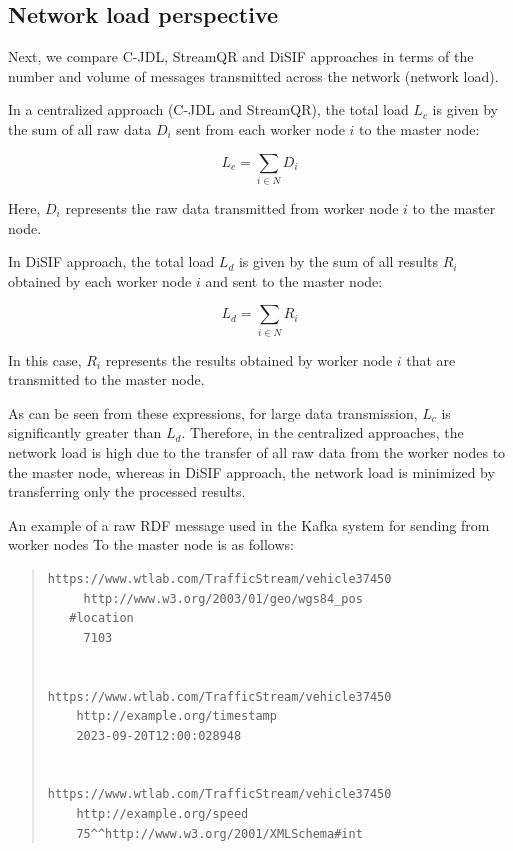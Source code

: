 \documentclass[5p,times]{elsarticle}
\begin{document}
\subsection{Network load perspective}


Next, we compare C-JDL, StreamQR and DiSIF approaches
 in terms of the number and volume of messages transmitted across the network (network load).

In a centralized approach (C-JDL and StreamQR), the total load \(L_c\) is given by the sum
 of all raw data \(D_i\) sent from each worker node \(i\) to the master node:

\begin{equation}
    L_c = \sum_{i \in N} D_i
    \end{equation}

Here, \(D_i\) represents the raw data transmitted from worker node \(i\) to the master node.

In DiSIF approach, the total load \(L_d\) is given by the sum of all results \(R_i\)
 obtained by each worker node \(i\) and sent to the master node:


\begin{equation}
    L_d = \sum_{i \in N} R_i
\end{equation}
    
In this case, \(R_i\) represents the results obtained by worker node \(i\)
 that are transmitted to the master node.

As can be seen from these expressions, for large data transmission, \(L_c\)
 is significantly greater than \(L_d\). Therefore, in the centralized approaches,
  the network load is high due to the transfer of all raw data from the worker nodes
   to the master node, whereas in DiSIF approach, the network load is minimized by transferring
    only the processed results.




An example of a raw RDF message used in the Kafka system for sending from worker nodes To
 the master node is as follows:

\small
\begin{quote}
\begin{verbatim}
https://www.wtlab.com/TrafficStream/vehicle37450
	 http://www.w3.org/2003/01/geo/wgs84_pos
   #location
	 7103


https://www.wtlab.com/TrafficStream/vehicle37450 
	http://example.org/timestamp 
	2023-09-20T12:00:028948


https://www.wtlab.com/TrafficStream/vehicle37450
	http://example.org/speed
	75^^http://www.w3.org/2001/XMLSchema#int
\end{verbatim}
\end{quote}
\end{document}
